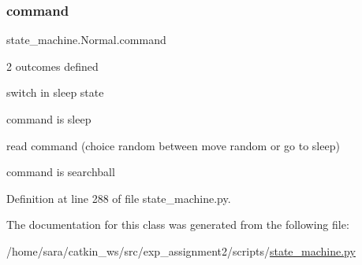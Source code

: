\subsubsection{\texorpdfstring{command}{command}}
{\footnotesize\ttfamily state\+\_\+machine.\+Normal.\+command}



2 outcomes defined 

switch in sleep state

command is sleep

read command (choice random between move random or go to sleep)

command is searchball 

Definition at line 288 of file state\+\_\+machine.\+py.



The documentation for this class was generated from the following file\+:\begin{DoxyCompactItemize}
\item 
/home/sara/catkin\+\_\+ws/src/exp\+\_\+assignment2/scripts/\hyperlink{state__machine_8py}{state\+\_\+machine.\+py}\end{DoxyCompactItemize}
